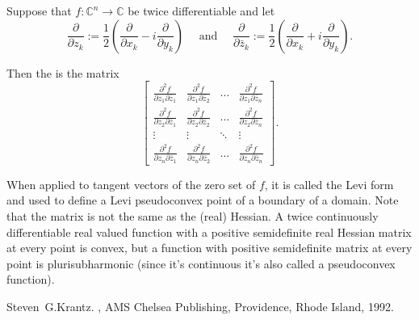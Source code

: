 \documentclass[12pt]{article}
\begin{document}
Suppose that $f \colon {\mathbb{C}}^n \to \mathbb{C}$ be twice differentiable
and let
\begin{equation*}
\frac{\partial}{\partial z_k} :=
\frac{1}{2}\left(
  \frac{\partial}{\partial x_k} - i \frac{\partial}{\partial y_k}
\right)
\quad \text{ and } \quad
\frac{\partial}{\partial \bar{z}_k} :=
\frac{1}{2}\left(
  \frac{\partial}{\partial x_k} + i \frac{\partial}{\partial y_k}
\right) .
\end{equation*}

Then the {\em {}} is the matrix
\begin{equation*}
\begin{bmatrix}
\frac{\partial^2 f}{\partial z_1 \partial \bar{z}_1} &
  \frac{\partial^2 f}{\partial z_1 \partial \bar{z}_2} &
    \ldots &
      \frac{\partial^2 f}{\partial z_1 \partial \bar{z}_n}
\\
\frac{\partial^2 f}{\partial z_2 \partial \bar{z}_1} &
  \frac{\partial^2 f}{\partial z_2 \partial \bar{z}_2} &
    \ldots &
      \frac{\partial^2 f}{\partial z_2 \partial \bar{z}_n}
\\
\vdots &
  \vdots &
    \ddots &
      \vdots
\\
\frac{\partial^2 f}{\partial z_n \partial \bar{z}_1} &
  \frac{\partial^2 f}{\partial z_n \partial \bar{z}_2} &
    \ldots &
      \frac{\partial^2 f}{\partial z_n \partial \bar{z}_n}
\end{bmatrix}
.
\end{equation*}

When applied to tangent vectors of the zero set of $f$,
it is called the Levi form and used to define a Levi
pseudoconvex point of a boundary of a domain.  Note that the 
matrix is not the same as the  (real) Hessian.  A twice continuously
differentiable real valued
function with a
positive semidefinite real Hessian matrix at every point is convex, but a function with
positive semidefinite  matrix at every point is
plurisubharmonic (since it's
continuous it's also called a pseudoconvex function).

\begin{thebibliography}{9}
Steven~G.\@ Krantz.
{\em {}},
AMS Chelsea Publishing, Providence, Rhode Island, 1992.
\end{thebibliography}
\end{document}
